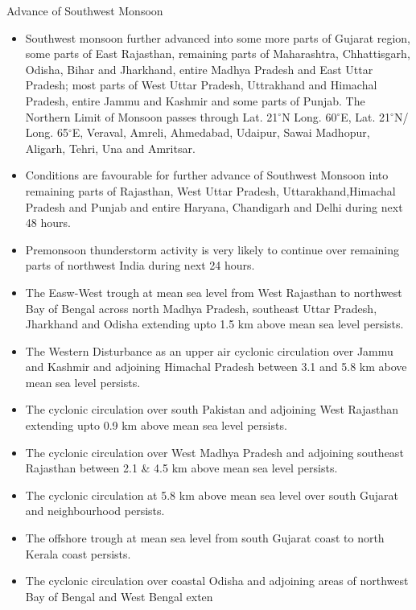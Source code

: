 \documentclass[10pt,a4paper]{article} %
\newcommand{\NewsItem}[1]{ %
\usefont{T1}{fvs}{n}{n} %
\vspace{24pt}\large #1\vspace{3pt} %
\par \normalsize \normalfont}
\begin{document}
\NewsItem{Advance of Southwest Monsoon}
\begin{multicols}{2} %
\begin{itemize}
\item Southwest monsoon further advanced into some more parts of Gujarat region, some parts of East Rajasthan,
remaining parts of Maharashtra, Chhattisgarh, Odisha, Bihar and Jharkhand, entire Madhya Pradesh and East Uttar Pradesh;
most parts of West Uttar Pradesh, Uttrakhand and Himachal Pradesh, entire Jammu and Kashmir and some parts of Punjab. The Northern Limit of Monsoon passes through Lat. 21$^\circ$N Long. 60$^\circ$E, Lat. 21$^\circ$N/ Long. 65$^\circ$E, Veraval, Amreli, Ahmedabad, Udaipur, Sawai Madhopur, Aligarh, Tehri, Una and Amritsar.

\item Conditions are favourable for further advance of Southwest Monsoon into remaining parts of Rajasthan, West Uttar Pradesh,
Uttarakhand,Himachal Pradesh and Punjab and entire Haryana, Chandigarh and Delhi during next 48 hours.

\item Premonsoon thunderstorm activity is very likely to continue over remaining parts of northwest
India during next 24 hours.

\item The Easw-West trough at mean sea level from West Rajasthan to northwest Bay of Bengal across north Madhya Pradesh,
southeast Uttar Pradesh, Jharkhand and Odisha extending upto 1.5 km above mean sea level persists.

\item The Western Disturbance as an upper air cyclonic circulation over Jammu and Kashmir and adjoining Himachal Pradesh between 3.1 and 5.8 km above mean sea level persists. 

\item The cyclonic circulation over south Pakistan and adjoining West Rajasthan extending upto 0.9 km above mean sea level persists.

\item The cyclonic circulation over West Madhya Pradesh and adjoining southeast Rajasthan between 2.1 \& 4.5 km above mean sea
level persists.

\item The cyclonic circulation at 5.8 km above mean sea level over south Gujarat and neighbourhood persists.

\item The offshore trough at mean sea level from south Gujarat coast to north Kerala coast persists.

\item The cyclonic circulation over coastal Odisha and adjoining areas of northwest Bay of Bengal and West Bengal exten
\end{itemize}

\end{multicols}
\end{document}
